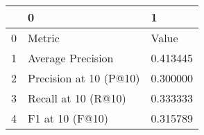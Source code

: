 \begin{tabular}{lll}
\toprule
 & 0 & 1 \\
\midrule
0 & Metric & Value \\
1 & Average Precision & 0.413445 \\
2 & Precision at 10 (P@10) & 0.300000 \\
3 & Recall at 10 (R@10) & 0.333333 \\
4 & F1 at 10 (F@10) & 0.315789 \\
\bottomrule
\end{tabular}
